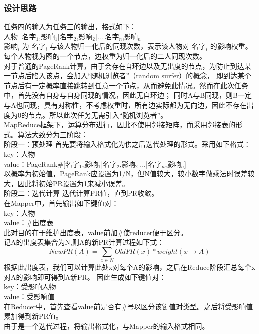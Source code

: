 \documentclass[a4paper,UTF8]{article}
\numberwithin{equation}{section}
\begin{document}
\subsubsection{设计思路}
任务四的输入为任务三的输出，格式如下：\\
人物 [名字$_1$,影响$_1$|名字$_2$,影响$_2$|...|名字$_n$,影响$_n$] \\
影响$_i$ 为 名字$_i$ 与该人物归一化后的同现次数，表示该人物对 名字$_i$ 的影响权重。\\
每个人物视为图的一个节点，边权重为归一化后的二人同现次数。\\
对于普通的PageRank计算，由于会存在自环边以及无出度的节点，为防止到达某一节点后陷入该点，会加入“随机浏览者”（random surfer）的概念，
即到达某个节点后有一定概率直接跳转到任意一个节点，从而避免此情况。然而在此次任务中，首先没有自身与自身同现的情况，因此无自环边；
同时A与B同现，则B一定与A也同现，具有对称性，不考虑权重时，所有边实际都为无向边，因此不存在出度为0的节点。所以此次任务无需引入“随机浏览者”。\\

MapReduce框架下，运算分布进行，因此不使用邻接矩阵，而采用邻接表的形式。算法大致分为三阶段：\\

阶段一：预处理
首先要将输入格式化为供之后迭代处理的形式。采用如下格式：\\
key：人物\\
value：PageRank\#[名字$_1$,影响$_1$|名字$_2$,影响$_2$|...|名字$_n$,影响$_n$] \\
以概率为初始值，PageRank应设置为1/N，但N值较大，较小数字做乘法时误差较大，因此将初始PR设置为1来减小误差。\\

阶段二：迭代计算
迭代计算PR值，直到PR收敛。\\
在Mapper中，首先输出如下键值对：\\
key：人物\\
value：\#出度表\\
此对目的在于维护出度表，value前加\#使reducer便于区分。\\
记A的出度表集合为N,则A的新PR计算过程如下式：
$$
NewPR(A)=\sum_{x\in N}OldPR(x)*weight(x\rightarrow A)
$$
根据此出度表，我们可以计算此处x对每个A的影响，之后在Reduce阶段汇总每个x对A的影响即可得到A新PR。
因此生成如下键值对：\\
key：受影响人物\\
value：受影响值\\
在Reducer中，首先查看value前是否有\#号以区分该键值对类型。之后将受影响值累加得到新PR值。\\
由于是一个迭代过程，将输出格式化，与Mapper的输入格式相同。\\
\end{document}
